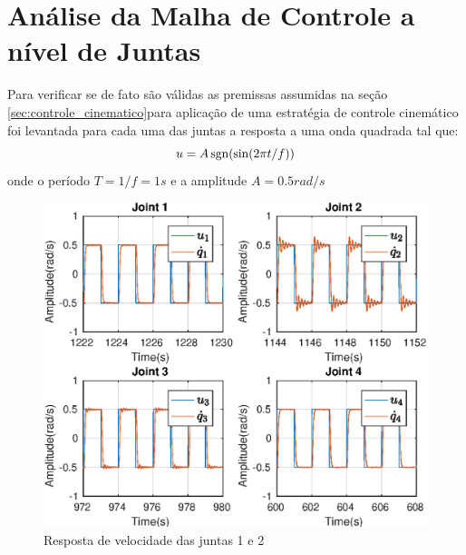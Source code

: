\section{Análise da Malha de Controle a nível de Juntas}
Para verificar se de fato são válidas as premissas assumidas na seção \ref{sec:controle_cinematico}para aplicação de uma estratégia de controle cinemático foi levantada para cada uma das juntas a resposta a uma onda quadrada tal que:
\[ u = A \operatorname{sgn}(\sin( 2\pi t/f)) \]
onde o período $T = 1/f = 1s$ e a amplitude $A = 0.5 rad/s$

\newlength{\imageheight}
\begin{figure}[H]
  \centering
    \includegraphics[width=\textwidth, clip=true, trim = 0 0.5\imageheight 0 0 0 mm]{./img/internal_loop}
  \caption{Resposta de velocidade das juntas 1 e 2}
\end{figure}

